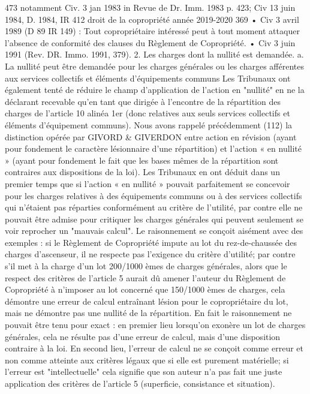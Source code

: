 473 notamment Civ. 3 jan 1983 in Revue de Dr. Imm. 1983 p. 423; Civ 13 juin 1984, D. 1984, IR 412
droit de la copropriété année 2019-2020
369
• Civ 3 avril 1989 (D 89 IR 149) : Tout copropriétaire intéressé peut à tout moment attaquer l'absence de conformité des clauses du Règlement de Copropriété.
• Civ 3 juin 1991 (Rev. DR. Immo. 1991, 379).
2. Les charges dont la nullité est demandée.
a. La nullité peut être demandée pour les charges générales ou les charges afférentes aux services collectifs et éléments d’équipements communs
Les Tribunaux ont également tenté de réduire le champ d'application de l'action en "nullité" en ne la déclarant recevable qu'en tant que dirigée à l'encontre de la répartition des charges de l'article 10 alinéa 1er (donc relatives aux seuls services collectifs et éléments d'équipement communs).
Nous avons rappelé précédemment (112) la distinction opérée par GIVORD \& GIVERDON entre action en révision (ayant pour fondement le caractère lésionnaire d'une répartition) et l'action « en nullité » (ayant pour fondement le fait que les bases mêmes de la répartition sont contraires aux dispositions de la loi).
Les Tribunaux en ont déduit dans un premier temps que si l'action « en nullité » pouvait parfaitement se concevoir pour les charges relatives à des équipements communs ou à des services collectifs qui n'étaient pas réparties conformément au critère de l'utilité, par contre elle ne pouvait être admise pour critiquer les charges générales qui peuvent seulement se voir reprocher un "mauvais calcul".
Le raisonnement se conçoit aisément avec des exemples : si le Règlement de Copropriété impute au lot du rez-de-chaussée des charges d'ascenseur, il ne respecte pas l'exigence du critère d'utilité; par contre s'il met à la charge d'un lot 200/1000 èmes de charges générales, alors que le respect des critères de l'article 5 aurait dû amener l'auteur du Règlement de Copropriété à n'imposer au lot concerné que 150/1000 èmes de charges, cela démontre une erreur de calcul entraînant lésion pour le copropriétaire du lot, mais ne démontre pas une nullité de la répartition.
En fait le raisonnement ne pouvait être tenu pour exact : en premier lieu lorsqu'on exonère un lot de charges générales, cela ne résulte pas d'une erreur de calcul, mais d'une disposition contraire à la loi. En second lieu, l'erreur de calcul ne se conçoit comme erreur et non comme atteinte aux critères légaux que si elle est purement matérielle; si l'erreur est "intellectuelle" cela signifie que son auteur n'a pas fait une juste application des critères de l'article 5 (superficie, consistance et situation).
